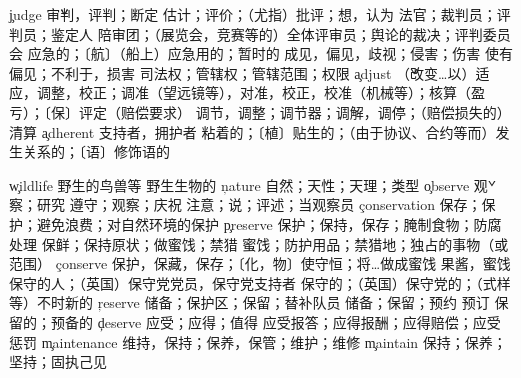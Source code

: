 \begin{multicols}{2}
\c{judge}  \v 审判，评判；断定 \vt 估计；评价；（尤指）批评；想，认为 \n 法官；裁判员；评判员；鉴定人
  \n 陪审团；（展览会，竞赛等的）全体评审员；舆论的裁决；评判委员会 \a 应急的；〔航〕（船上）应急用的；暂时的
  \n 成见，偏见，歧视；侵害；伤害 \vt 使有偏见；不利于，损害
  \n 司法权；管辖权；管辖范围；权限
\c{adjust}  \v （改变…以）适应，调整，校正；调准（望远镜等），对准，校正，校准（机械等）；核算（盈亏）；〔保〕评定（赔偿要求）
  \n 调节，调整；调节器；调解，调停；（赔偿损失的）清算 
\c{adherent}  \n 支持者，拥护者 \a 粘着的；〔植〕贴生的；（由于协议、合约等而）发生关系的；〔语〕修饰语的

\c{wildlife}  \n 野生的鸟兽等 \a 野生生物的 
\c{nature}  \n 自然；天性；天理；类型
\c{observe}  \v 观察；研究 \vt 遵守；观察；庆祝 \vi 注意；说；评述；当观察员
\c{conservation}  \n 保存；保护；避免浪费；对自然环境的保护
\c{preserve}  \vt 保护；保持，保存；腌制食物；防腐处理 \vi 保鲜；保持原状；做蜜饯；禁猎 \n 蜜饯；防护用品；禁猎地；独占的事物（或范围）
\c{conserve}  \vt 保护，保藏，保存；〔化，物〕使守恒；将…做成蜜饯 \n 果酱，蜜饯
  \n 保守的人；（英国）保守党党员，保守党支持者 \a 保守的；（英国）保守党的；（式样等）不时新的
\c{reserve}  \n 储备；保护区；保留；替补队员 \vt 储备；保留；预约 \vi 预订 \a 保留的；预备的
\c{deserve}  \vt 应受；应得；值得 \vi 应受报答；应得报酬；应得赔偿；应受惩罚
\c{maintenance}  \n 维持，保持；保养，保管；维护；维修
\c{maintain}  \vt 保持；保养；坚持；固执己见




\end{multicols}
